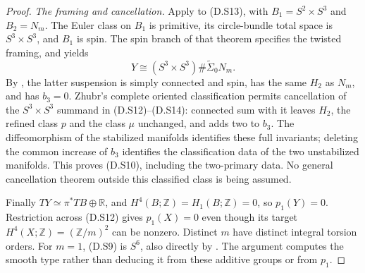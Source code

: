 \begin{proof}
\emph{The framing and cancellation.}
Apply \cite[Theorem A]{manGR25} to (D.S13), with
$B_1=S^2\times S^3$ and $B_2=N_m$.
The Euler class on $B_1$ is primitive, its circle-bundle
total space is $S^3\times S^3$, and $B_1$ is spin.
The spin branch of that theorem specifies the twisted
framing, and yields
\[
          Y\cong(S^3\times S^3)\#\widetilde\Sigma_0 N_m.
 \tag{D.S14}
\]
By \cite[Lemma 5.2]{manGR25}, the latter suspension is
simply connected and spin, has the same $H_2$ as $N_m$,
and has $b_3=0$. Zhubr's complete oriented classification
\cite[Theorem 1]{manZhubr75} permits cancellation of the
$S^3\times S^3$ summand in (D.S12)--(D.S14): connected
sum with it leaves $H_2$, the refined class $p$ and the
class $\mu$ unchanged, and adds two to $b_3$.
The diffeomorphism of the stabilized manifolds identifies
these full invariants; deleting the common increase of
$b_3$ identifies the classification data of the two
unstabilized manifolds. This proves (D.S10), including
the two-primary data. No general cancellation theorem
outside this classified class is being assumed.

Finally $TY\simeq\pi^*TB\oplus\mathbb R$, and
$H^4(B;\mathbb Z)=H_1(B;\mathbb Z)=0$, so $p_1(Y)=0$.
Restriction across (D.S12) gives $p_1(X)=0$ even though
its target $H^4(X;\mathbb Z)=(\mathbb Z/m)^2$ can be
nonzero. Distinct $m$ have distinct integral torsion
orders. For $m=1$, (D.S9) is $S^6$, also directly by
\cite[Example 5.3(1)]{manGR25}.
The argument computes the smooth type rather than
deducing it from these additive groups or from $p_1$.
\end{proof}

